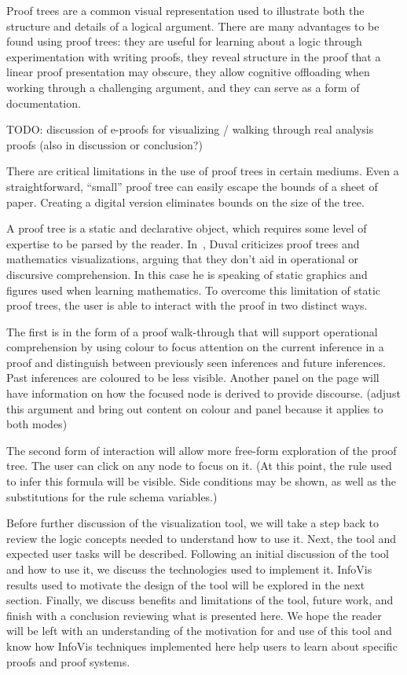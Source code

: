 \documentclass[conference]{IEEEtran}
\begin{document}
Proof trees are a common visual representation used to illustrate both the structure and details of a logical argument. There are many advantages to be found using proof trees: they are useful for learning about a logic through experimentation with writing proofs, they reveal structure in the proof that a linear proof presentation may obscure, they allow cognitive offloading when working through a challenging argument, and they can serve as a form of documentation.

TODO: discussion of e-proofs for visualizing / walking through real analysis proofs (also in discussion or conclusion?)~\cite{eproofs-alcock+wilkinson}

There are critical limitations in the use of proof trees in certain mediums. Even a straightforward, ``small'' proof tree can easily escape the bounds of a sheet of paper. Creating a digital version eliminates bounds on the size of the tree.

A proof tree is a static and declarative object, which requires some level of expertise to be parsed by the reader. In~\cite{repvisvis-duval}, Duval criticizes proof trees and mathematics visualizations, arguing that they don’t aid in operational or discursive comprehension. In this case he is speaking of static graphics and figures used when learning mathematics. To overcome this limitation of static proof trees, the user is able to interact with the proof in two distinct ways.

The first is in the form of a proof walk-through that will support operational comprehension by using colour to focus attention on the current inference in a proof and distinguish between previously seen inferences and future inferences. Past inferences are coloured to be less visible. Another panel on the page will have information on how the focused node is derived to provide discourse. (adjust this argument and bring out content on colour and panel because it applies to both modes)

The second form of interaction will allow more free-form exploration of the proof tree. The user can click on any node to focus on it. (At this point, the rule used to infer this formula will be visible. Side conditions may be shown, as well as the substitutions for the rule schema variables.)

Before further discussion of the visualization tool, we will take a step back to review the logic concepts needed to understand how to use it. Next, the tool and expected user tasks will be described. Following an initial discussion of the tool and how to use it, we discuss the technologies used to implement it. InfoVis results used to motivate the design of the tool will be explored in the next section. Finally, we discuss benefits and limitations of the tool, future work, and finish with a conclusion reviewing what is presented here. We hope the reader will be left with an understanding of the motivation for and use of this tool and know how InfoVis techniques implemented here help users to learn about specific proofs and proof systems.
\end{document}
